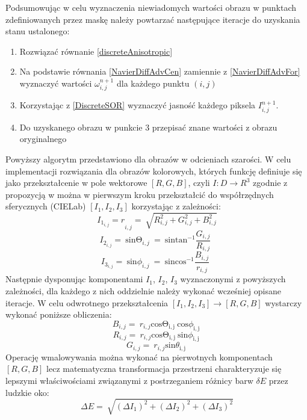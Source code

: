 \documentclass[12pt, twoside, openany]{report}
\theoremstyle{definition}
\begin{document}
\par
Podsumowując w celu wyznaczenia niewiadomych wartości obrazu w punktach zdefiniowanych przez maskę należy powtarzać następujące iteracje do uzyskania stanu ustalonego:
\begin{enumerate}
\item
Rozwiązać równanie \eqref{discreteAnisotropic} 
\item
Na podstawie równania \eqref{NavierDiffAdvCen} zamiennie z \eqref{NavierDiffAdvFor} wyznaczyć wartości $\omega_{i,j}^{n+1}$ dla każdego punktu $(i,j)$ 
\item
Korzystając z \eqref{DiscreteSOR} wyznaczyć jasność każdego piksela $I_{i,j}^{n+1}$.
\item
Do uzyskanego obrazu w punkcie 3 przepisać znane wartości z obrazu oryginalnego
\end{enumerate}
Powyższy algorytm przedstawiono dla obrazów w odcieniach szarości. W celu implementacji rozwiązania dla obrazów kolorowych, których funkcję definiuje się jako przekształcenie w pole wektorowe $[R,G,B]$, czyli $I:D\to R^3$  zgodnie z propozycją w \cite{fishelov2006image} można w pierwszym kroku przekształcić do współrzędnych sferycznych (CIELab) $\left[I_{1},I_{2},I_{3} \right]$ korzystając z zależności:
\begin{equation}
{I_{1_{i,j}}=r}_{i,j}=\ \sqrt{R^2_{i,j}+G^2_{i,j}+B^2_{i,j}}
\label{TIone}
\end{equation}
\begin{equation}
I_{2_{i,j}}=\ {\mathrm{sin} {\mathrm{\Theta }}_{i,j}\ }=\ {\mathrm{sin} {{\mathrm{tan}}^{-1} \frac{G_{i,j}}{R_{i,j}}\ }\ } 
\label{TItwo}
\end{equation}
\begin{equation}
I_{3_{i,j}}=\ {\mathrm{sin} {\phi }_{i,j}\ }=\ {\mathrm{sin} {{\mathrm{cos}}^{-1} \frac{B_{i,j}}{r_{i,j}}\ }\ } 
\label{TIthree}
\end{equation}
Następnie dysponując komponentami $I_1$, $I_2$, $I_3$ wyznaczonymi z powyższych zależności, dla każdego z nich oddzielnie należy wykonać wcześniej opisane iteracje. W celu odwrotnego przekształcenia $\left[I_1,I_2,I_3 \right]\to\left[R,G,B\right]$ wystarczy wykonać poniższe obliczenia:
\begin{equation}
 B_{i,j}=\ r_{i,j}{\mathrm{cos} {\mathrm{\Theta }}_{\mathrm{i,j}}\ }{\mathrm{cos} {\phi }_{\mathrm{i,j}}\ }
\label{TInvIone}
\end{equation}
\begin{equation}
R_{i,j}=\ r_{i,j}{\mathrm{cos} {\mathrm{\Theta }}_{\mathrm{i,j}}\ }{\mathrm{sin} {\phi }_{\mathrm{i,j}}\ }
\label{TInvItwo}
\end{equation}
\begin{equation}
G_{i,j}=\ r_{i,j}{\mathrm{sin} {\theta }_{\mathrm{i,j}}\ } 
\label{TInvIthree}
\end{equation}
Operację wmalowywania można wykonać na pierwotnych komponentach $[R,G,B]$ lecz matematyczna transformacja przestrzeni charakteryzuje się lepszymi właściwościami związanymi z postrzeganiem różnicy barw $\delta E$ przez ludzkie oko:
\begin{equation}
\Delta E=\ \sqrt{{\left(\Delta I_1\right)}^2+{\left(\Delta I_2\right)}^2+{\left(\Delta I_3\right)}^2}
\label{deltaE}
\end{equation}
\end{document}
